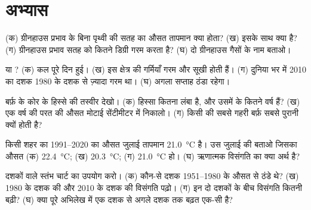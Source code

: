 \section{अभ्यास}

\begin{exercise}[$\star$]\label{exo:g9:climate-past-and-present:1}
(क) ग्रीनहाउस प्रभाव के बिना पृथ्वी की सतह का औसत तापमान क्या होता? (ख) इसके साथ
क्या है? (ग) ग्रीनहाउस प्रभाव सतह को कितने डिग्री गरम करता है? (घ) दो ग्रीनहाउस गैसों
के नाम
बताओ।
\end{exercise}

\begin{exercise}[$\star$]\label{exo:g9:climate-past-and-present:2}
 या ? (क) कल पूरे दिन  हुई। (ख) इस क्षेत्र की गर्मियाँ गरम और सूखी होती
हैं। (ग) दुनिया भर में 2010 का दशक 1980 के दशक से ज़्यादा गरम था। (घ) अगला सप्ताह
ठंडा रहेगा।
\end{exercise}

\begin{exercise}[$\star$]\label{exo:g9:climate-past-and-present:3}
बर्फ़ के कोर के हिस्से की तस्वीर देखो। (क) हिस्सा कितना लंबा है, और उसमें  के कितने
वर्ष हैं? (ख) एक वर्ष की परत की औसत मोटाई सेंटीमीटर में निकालो। (ग) किसी  की
सबसे गहरी बर्फ़ सबसे पुरानी क्यों होती
है?
\end{exercise}

\begin{exercise}[$\star$]\label{exo:g9:climate-past-and-present:4}
किसी शहर का 1991--2020 का औसत जुलाई तापमान \qty{21.0}{\degreeCelsius} है। उस जुलाई
की  बताओ जिसका औसत (क) \qty{22.4}{\degreeCelsius}; (ख)
\qty{20.3}{\degreeCelsius}; (ग) \qty{21.0}{\degreeCelsius} हो। (घ) ऋणात्मक विसंगति
का क्या अर्थ है?
\end{exercise}

\begin{exercise}[$\star\star$]\label{exo:g9:climate-past-and-present:5}
दशकों वाले स्तंभ चार्ट का उपयोग करो। (क) कौन-से दशक 1951--1980 के औसत से ठंडे थे?
(ख) 1980 के दशक की और 2010 के दशक की विसंगति पढ़ो। (ग) इन दो दशकों के बीच विसंगति
कितनी बढ़ी? (घ) क्या पूरे अभिलेख में एक दशक से अगले दशक तक बढ़त एक-सी
है?
\end{exercise}

